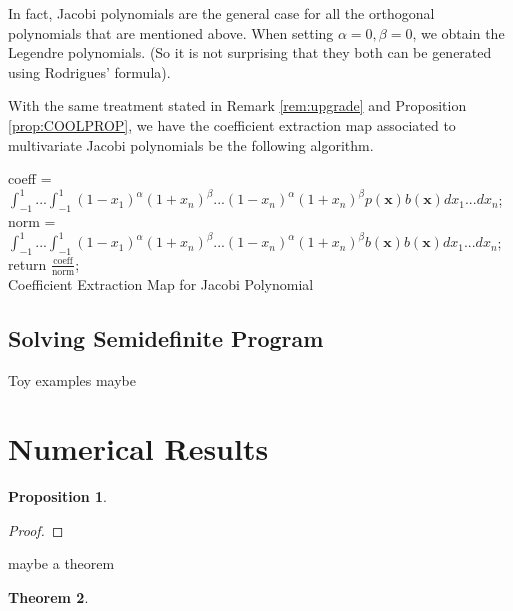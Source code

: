 \documentclass[12pt]{amsart}
\numberwithin{equation}{section}
\newtheorem{thm}{Theorem}
\newtheorem{prop}[thm]{Proposition}
\theoremstyle{definition}
\numberwithin{thm}{section}
\begin{document}
In fact, Jacobi polynomials are the general case for all the orthogonal polynomials that are mentioned above. 
When setting $\alpha = 0, \beta = 0$, we obtain the Legendre polynomials. (So it is not surprising that they both can be generated using Rodrigues' formula).

With the same treatment stated in Remark \ref{rem:upgrade} and Proposition \ref{prop:COOLPROP},
we have the {coefficient extraction map} associated to multivariate Jacobi polynomials be the following algorithm.

\begin{algorithm}[H]
     \SetAlgoLined
     coeff = $\int_{-1}^1 ... \int_{-1}^1 (1-x_1)^{\alpha} (1+x_n)^{\beta} ... (1-x_n)^{\alpha} (1+x_n)^{\beta} p(\mathbf{x})b(\mathbf{x}) dx_1 ... dx_n$;\\
     norm = $\int_{-1}^1 ... \int_{-1}^1 (1-x_1)^{\alpha} (1+x_n)^{\beta} ... (1-x_n)^{\alpha} (1+x_n)^{\beta} b(\mathbf{x}) b(\mathbf{x}) dx_1 ... dx_n$;\\
     return $\frac{\text{coeff}}{\text{norm}}$;\\
     \caption{Coefficient Extraction Map for Jacobi Polynomial}
\end{algorithm}




\subsection{Solving Semidefinite Program}
\label{Sec:Solving Semidefinite Program}




Toy examples maybe

\newpage
\section{Numerical Results}


\begin{prop}

\end{prop}

\begin{proof}

\end{proof}

maybe a theorem


\begin{thm}

\end{thm}
\end{document}

